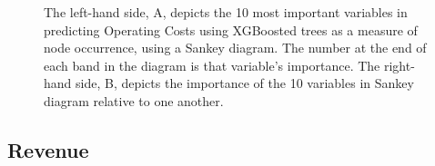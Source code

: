 \documentclass[review,12pt,authoryear]{elsarticle}
\begin{document}
\begin{linenumbers}
\begin{figure}
 \caption{The left-hand side, A,  depicts the 10 most important variables in predicting Operating Costs using XGBoosted trees as a measure of node occurrence, using a Sankey diagram. The number at the end of each band in the diagram is that variable's importance. The right-hand side, B, depicts the importance of the 10 variables in Sankey diagram relative to one another.}\label{fig:operating_costs_sankey}
\end{figure}

\subsection{Revenue}


\end{linenumbers}
\end{document}
